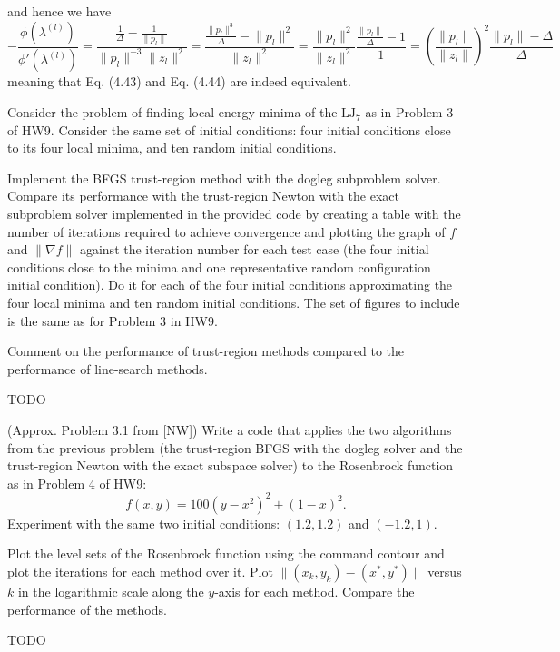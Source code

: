 \documentclass{../kin_math}
\begin{document}
\begin{questions}
\begin{solution}
    and hence we have
    \begin{equation*}
      -\frac{\phi(\lambda^{(l)})}{\phi'(\lambda^{(l)})} = \dfrac{\frac{1}{\Delta} - \frac{1}{\lVert p_l \rVert}}{\lVert p_l \rVert^{-3} \lVert z_l \rVert^2} = \dfrac{\frac{\lVert p_l \rVert^{3}}{\Delta} - \lVert p_l \rVert^2}{\lVert z_l \rVert^2} = \dfrac{\lVert p_l \rVert^2}{\lVert z_l \rVert^2} \dfrac{\frac{\lVert p_l \rVert}{\Delta} - 1}{1} = \left(\frac{\lVert p_l \rVert}{\lVert z_l \rVert}\right)^2 \frac{\lVert p_l \rVert - \Delta}{\Delta}
    \end{equation*}
    meaning that Eq. (4.43) and Eq. (4.44) are indeed equivalent.
  \end{solution}

  \question Consider the problem of finding local energy minima of the $\text{LJ}_7$ as in Problem 3 of HW9. Consider the same set of initial conditions: four initial conditions close to its four local minima, and ten random initial conditions.

  Implement the BFGS trust-region method with the dogleg subproblem solver. Compare its performance with the trust-region Newton with the exact subproblem solver implemented in the provided code by creating a table with the number of iterations required to achieve convergence and plotting the graph of $f$ and $\lVert \nabla f \rVert$ against the iteration number for each test case (the four initial conditions close to the minima and one representative random configuration initial condition). Do it for each of the four initial conditions approximating the four local minima and ten random initial conditions. The set of figures to include is the same as for Problem 3 in HW9.

  Comment on the performance of trust-region methods compared to the performance of line-search methods.
  \begin{solution}
    TODO
  \end{solution}

  \question (Approx. Problem 3.1 from [NW]) Write a code that applies the two algorithms from the previous problem (the trust-region BFGS with the dogleg solver and the trust-region Newton with the exact subspace solver) to the Rosenbrock function as in Problem 4 of HW9:
  \begin{equation}
    f(x, y) = 100(y - x^2)^2 + (1 - x)^2.
  \end{equation}
  Experiment with the same two initial conditions: $(1.2, 1.2)$ and $(-1.2, 1)$.

  Plot the level sets of the Rosenbrock function using the command contour and plot the iterations for each method over it. Plot $\lVert (x_k, y_k) - (x^*, y^*) \rVert$ versus $k$ in the logarithmic scale along the $y$-axis for each method. Compare the performance of the methods.
  \begin{solution}
    TODO
  \end{solution}
\end{questions}
\end{document}
